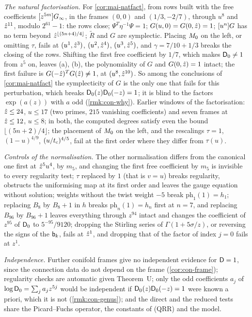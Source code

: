 \emph{The natural factorisation.} For \cref{cor:mai-natfact}, from rows built with the free coefficients $[z^{5m}]G_{\infty}$, in the frames $(0,0)$ and $(1/3,-2/7)$, through $u^8$ and $\hat{z}^{11}$, modulo $2^{61}-1$: the rows close; $\Psi^T\eta^{-1}\Psi=1$; $G(u,0)=G(0,\hat{z})=1$; $[u^n]G$ has no term beyond $\hat{z}^{\lfloor(5n+4)/4\rfloor}$; $\tilde R$ and $G$ are symplectic. Placing $M_{0}$ on the left, or omitting $\tau$, fails at $(u^1,\hat{z}^3)$, $(u^2,\hat{z}^4)$, $(u^3,\hat{z}^5)$, and $\gamma=7/10+1/3$ breaks the closing of the rows. Shifting the first free coefficient by $1/7$, which makes $\mathsf{D}_0\neq 1$ from $z^5$ on, leaves (a), (b), the polynomiality of $G$ and $G(0,\hat{z})=1$ intact; the first failure is $G(-\hat{z})^TG(\hat{z})\neq 1$, at $(u^8,\hat{z}^{10})$. So among the conclusions of \cref{cor:mai-natfact} the symplecticity of $G$ is the only one that fails for this perturbation, which breaks $\mathsf{D}_0(z)\mathsf{D}_0(-z)=1$; it is blind to the factors $\exp(a(z))$ with $a$ odd (\cref{rmk:con-why}). Earlier windows of the factorisation: $\hat{z}\leq 24$, $u\leq 17$ (two primes, $215$ vanishing coefficients) and seven frames at $\hat{z}\leq 12$, $u\leq 8$; in both, the computed degrees satisfy even the bound $\lfloor(5n+2)/4\rfloor$; the placement of $M_{0}$ on the left, and the rescalings $\tau=1$, $(1-u)^{4/9}$, $(u/t_{\mathrm{c}})^{4/5}$, fail at the first order where they differ from $\tau(u)$.

\emph{Controls of the normalisation.} The other normalisation differs from the canonical one first at $\hat{z}^5u^4$, by $m_5$, and changing the first free coefficient by $m_5$ is invisible to every regularity test; $\tau$ replaced by $1$ (that is $v=u$) breaks regularity, obstructs the uniformising map at its first order and leaves the gauge equation without solution; weights without the twist weight $-5$ break $\mathrm{ph}_1(1)=h_1$; replacing $B_8$ by $B_8+1$ in $h$ breaks $\mathrm{ph}_n(1)=h_n$ first at $n=7$, and replacing $B_{96}$ by $B_{96}+1$ leaves everything through $z^{94}$ intact and changes the coefficient of $z^{95}$ of $\mathsf{D}_0$ to $5^{-95}/9120$; dropping the Stirling series of $\Gamma(1+5\sigma/z)$, or reversing the signs of the $\mathsf{b}_k$, fails at $\hat{z}^1$, and dropping that of the factor of index $j=0$ fails at $z^1$.

\emph{Independence.} Further conifold frames give no independent evidence for $\mathsf{D}=1$, since the connection data do not depend on the frame (\cref{cor:con-frame}); regularity checks are automatic given Theorem~U; only the odd coefficients $a_j$ of $\log\mathsf{D}_0=\sum_ja_jz^{5j}$ would be independent if $\mathsf{D}_0(z)\mathsf{D}_0(-z)=1$ were known a priori, which it is not (\cref{rmk:con-genus}); and the direct and the reduced tests share the Picard--Fuchs operator, the constants of (QRR) and the model.

